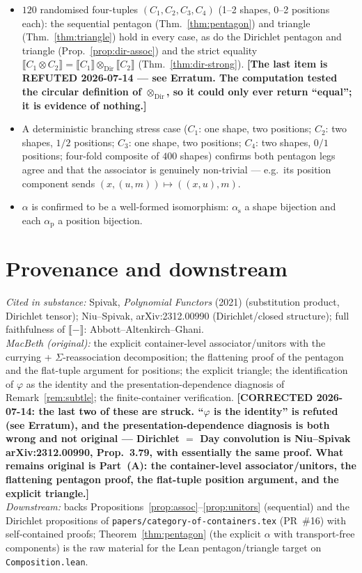 \documentclass[11pt]{article}
\theoremstyle{definition}
\newcommand{\ext}[1]{\llbracket #1 \rrbracket}
\newcommand{\dir}{\mathbin{\otimes}}
\begin{document}
\begin{itemize}
\item $120$ randomised four-tuples $(C_1,C_2,C_3,C_4)$ (1--2 shapes, 0--2
positions each): the sequential pentagon (Thm.~\ref{thm:pentagon}) and triangle
(Thm.~\ref{thm:triangle}) hold in every case, as do the Dirichlet pentagon and
triangle (Prop.~\ref{prop:dir-assoc}) and the strict equality
$\ext{C_1\dir C_2}=\ext{C_1}\dir_{\mathrm{Dir}}\ext{C_2}$ (Thm.~\ref{thm:dir-strong}).
\textbf{[The last item is REFUTED 2026-07-14 --- see Erratum. The computation
tested the circular definition of $\dir_{\mathrm{Dir}}$, so it could only ever
return ``equal''; it is evidence of nothing.]}
\item A deterministic branching stress case
($C_1$: one shape, two positions; $C_2$: two shapes, $1/2$ positions;
$C_3$: one shape, two positions; $C_4$: two shapes, $0/1$ positions; four-fold
composite of $400$ shapes) confirms both pentagon legs agree and that the
associator is genuinely non-trivial --- e.g.\ its position component sends
$(x,(u,m))\mapsto((x,u),m)$.
\item $\alpha$ is confirmed to be a well-formed isomorphism: $\alpha_{\mathrm s}$
a shape bijection and each $\alpha_{\mathrm p}$ a position bijection.
\end{itemize}

\section{Provenance and downstream}

\noindent\emph{Cited in substance:} Spivak, \emph{Polynomial Functors} (2021)
(substitution product, Dirichlet tensor); Niu--Spivak, arXiv:2312.00990
(Dirichlet/closed structure); full faithfulness of $\ext{-}$:
Abbott--Altenkirch--Ghani.\\
\emph{MacBeth (original):} the explicit container-level associator/unitors with
the currying + $\Sigma$-reassociation decomposition; the flattening proof of the
pentagon and the flat-tuple argument for positions; the explicit triangle; the
identification of $\varphi$ as the identity and the
presentation-dependence diagnosis of Remark~\ref{rem:subtle}; the finite-container
verification.
\textbf{[CORRECTED 2026-07-14: the last two of these are struck. ``$\varphi$ is
the identity'' is refuted (see Erratum), and the presentation-dependence
diagnosis is both wrong and not original --- Dirichlet $=$ Day convolution is
Niu--Spivak arXiv:2312.00990, Prop.~3.79, with essentially the same proof. What
remains original is Part~(A): the container-level associator/unitors, the
flattening pentagon proof, the flat-tuple position argument, and the explicit
triangle.]}\\
\emph{Downstream:} backs Propositions~\ref{prop:assoc}--\ref{prop:unitors} (sequential) and the Dirichlet propositions of
\texttt{papers/category-of-containers.tex} (PR~\#16) with self-contained proofs;
Theorem~\ref{thm:pentagon} (the explicit $\alpha$ with transport-free
components) is the raw material for the Lean pentagon/triangle target on
\texttt{Composition.lean}.
\end{document}

